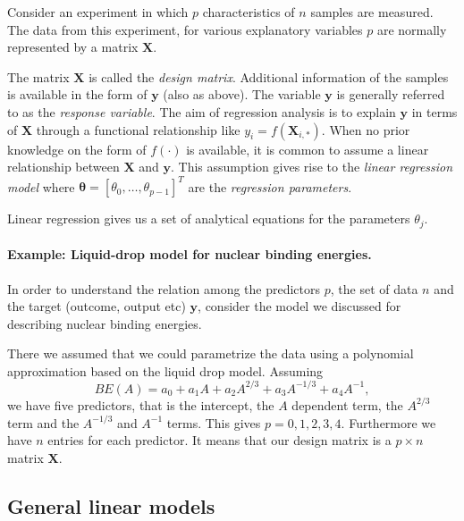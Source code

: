 \documentclass[%
oneside,                 %
final,                   %
10pt]{article}
\newenvironment{block_mdfboxadmon}[1][]{
\begin{block_mdfboxmdframed}[frametitle=#1]
}
{
\end{block_mdfboxmdframed}
}
\begin{document}
\begin{block_mdfboxadmon}[]
Consider an experiment in which $p$ characteristics of $n$ samples are
measured. The data from this experiment, for various explanatory variables $p$ are normally represented by a matrix  
$\mathbf{X}$.

The matrix $\mathbf{X}$ is called the \emph{design
matrix}. Additional information of the samples is available in the
form of $\bm{y}$ (also as above). The variable $\bm{y}$ is
generally referred to as the \emph{response variable}. The aim of
regression analysis is to explain $\bm{y}$ in terms of
$\bm{X}$ through a functional relationship like $y_i =
f(\mathbf{X}_{i,\ast})$. When no prior knowledge on the form of
$f(\cdot)$ is available, it is common to assume a linear relationship
between $\bm{X}$ and $\bm{y}$. This assumption gives rise to
the \emph{linear regression model} where $\bm{\theta} = [\theta_0, \ldots,
\theta_{p-1}]^{T}$ are the \emph{regression parameters}. 

Linear regression gives us a set of analytical equations for the parameters $\theta_j$.
\end{block_mdfboxadmon} %





\paragraph{Example: Liquid-drop model for nuclear binding energies.}

\begin{block_mdfboxadmon}[]
In order to understand the relation among the predictors $p$, the set of data $n$ and the target (outcome, output etc) $\bm{y}$,
consider the model we discussed for describing nuclear binding energies. 

There we assumed that we could parametrize the data using a polynomial approximation based on the liquid drop model.
Assuming 
\[
BE(A) = a_0+a_1A+a_2A^{2/3}+a_3A^{-1/3}+a_4A^{-1},
\]
we have five predictors, that is the intercept, the $A$ dependent term, the $A^{2/3}$ term and the $A^{-1/3}$ and $A^{-1}$ terms.
This gives $p=0,1,2,3,4$. Furthermore we have $n$ entries for each predictor. It means that our design matrix is a 
$p\times n$ matrix $\bm{X}$.
\end{block_mdfboxadmon} %




\subsection{General linear models}
\end{document}

